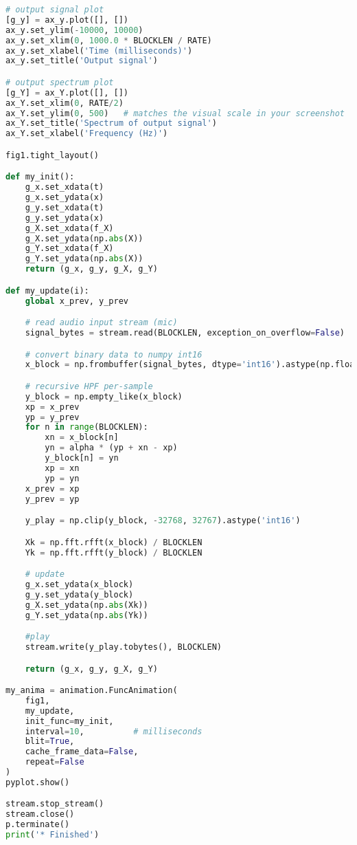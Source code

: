 \documentclass[11pt]{article}
\begin{document}
\begin{lstlisting}[language=python, label={lst:code}, breaklines=true, caption={example code}]
# output signal plot
[g_y] = ax_y.plot([], [])
ax_y.set_ylim(-10000, 10000)
ax_y.set_xlim(0, 1000.0 * BLOCKLEN / RATE)
ax_y.set_xlabel('Time (milliseconds)')
ax_y.set_title('Output signal')

# output spectrum plot
[g_Y] = ax_Y.plot([], [])
ax_Y.set_xlim(0, RATE/2)
ax_Y.set_ylim(0, 500)   # matches the visual scale in your screenshot
ax_Y.set_title('Spectrum of output signal')
ax_Y.set_xlabel('Frequency (Hz)')

fig1.tight_layout()

def my_init():
    g_x.set_xdata(t)
    g_x.set_ydata(x)
    g_y.set_xdata(t)
    g_y.set_ydata(x)
    g_X.set_xdata(f_X)
    g_X.set_ydata(np.abs(X))
    g_Y.set_xdata(f_X)
    g_Y.set_ydata(np.abs(X))
    return (g_x, g_y, g_X, g_Y)

def my_update(i):
    global x_prev, y_prev

    # read audio input stream (mic)
    signal_bytes = stream.read(BLOCKLEN, exception_on_overflow=False)

    # convert binary data to numpy int16
    x_block = np.frombuffer(signal_bytes, dtype='int16').astype(np.float64)

    # recursive HPF per-sample
    y_block = np.empty_like(x_block)
    xp = x_prev
    yp = y_prev
    for n in range(BLOCKLEN):
        xn = x_block[n]
        yn = alpha * (yp + xn - xp)
        y_block[n] = yn
        xp = xn
        yp = yn
    x_prev = xp
    y_prev = yp

    y_play = np.clip(y_block, -32768, 32767).astype('int16')

    Xk = np.fft.rfft(x_block) / BLOCKLEN
    Yk = np.fft.rfft(y_block) / BLOCKLEN

    # update
    g_x.set_ydata(x_block)
    g_y.set_ydata(y_block)
    g_X.set_ydata(np.abs(Xk))
    g_Y.set_ydata(np.abs(Yk))

    #play
    stream.write(y_play.tobytes(), BLOCKLEN)

    return (g_x, g_y, g_X, g_Y)

my_anima = animation.FuncAnimation(
    fig1,
    my_update,
    init_func=my_init,
    interval=10,          # milliseconds
    blit=True,
    cache_frame_data=False,
    repeat=False
)
pyplot.show()

stream.stop_stream()
stream.close()
p.terminate()
print('* Finished')

\end{lstlisting}    

    
\end{document}
